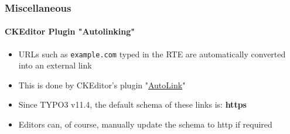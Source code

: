 %

\begin{frame}[fragile]
	\frametitle{Miscellaneous}
	\framesubtitle{CKEditor Plugin "Autolinking"}


	\begin{itemize}
		\item URLs such as \texttt{example.com} typed in the RTE are automatically
			converted into an external link
		\item This is done by CKEditor's plugin
			"\href{https://ckeditor.com/docs/ckeditor5/latest/features/link.html#autolink-feature}{AutoLink}"
		\item Since TYPO3 v11.4, the default schema of these links is: \textbf{https}
		\item Editors can, of course, manually update the schema to http if required
	\end{itemize}

\end{frame}

